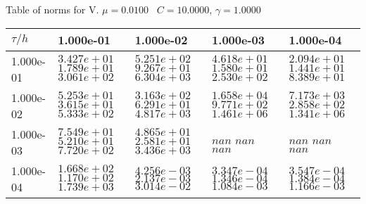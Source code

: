 \begin{center}
Table of norms for V. $\mu = 0.0100$ \, $C = 10.0000$, $\gamma = 1.0000$
  
\begin{tabular}{|p{1in}|p{1in}|p{1in}|p{1in}|p{1in}|} \hline
$\tau / h$ &1.000e-01 &1.000e-02 &1.000e-03 &1.000e-04 \\ \hline 
1.000e-01 & $3.427e+01$  $1.789e+01$  $3.061e+02$  & $5.251e+02$  $9.267e+01$  $6.304e+03$  & $4.618e+01$  $1.580e+01$  $2.530e+02$  & $2.094e+01$  $1.441e+01$  $8.389e+01$  \\ \hline 
1.000e-02 & $5.253e+01$  $3.615e+01$  $5.333e+02$  & $3.163e+02$  $6.291e+01$  $4.817e+03$  & $1.658e+04$  $9.771e+02$  $1.461e+06$  & $7.173e+03$  $2.858e+02$  $1.341e+06$  \\ \hline 
1.000e-03 & $7.549e+01$  $5.210e+01$  $7.720e+02$  & $4.865e+01$  $2.581e+01$  $3.436e+03$  & $nan$  $nan$  $nan$  & $nan$  $nan$  $nan$  \\ \hline 
1.000e-04 & $1.668e+02$  $1.170e+02$  $1.739e+03$  & $4.256e-03$  $2.137e-03$  $3.014e-02$  & $3.347e-04$  $1.346e-04$  $1.084e-03$  & $3.547e-04$  $1.384e-04$  $1.166e-03$  \\ \hline 

\end{tabular}\\[20pt]
\end{center}
